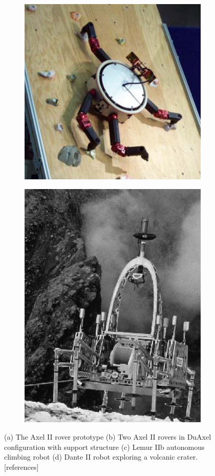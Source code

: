 \documentclass[12pt]{article}
\newcommand{\kostas}[1]{{\color{blue} #1}}
\begin{document}
\begin{figure}
\begin{subfigure}{.245\textwidth}
    \includegraphics[width=.88\linewidth]{lemur_prototype}
    \caption{}
    \label{fig:lemur}
  \end{subfigure}%
  \begin{subfigure}{.245\textwidth}
    \centering
    \includegraphics[width=.65\linewidth]{dante_prototype}
    \caption{}
    \label{fig:dante}
  \end{subfigure}  %
  \label{fig:prototypes}
  \vspace{-0.1in}
  \caption{(a) The Axel II rover prototype (b) Two Axel II rovers in DuAxel configuration 
  with support structure (c) Lemur IIb autonomous climbing robot (d) Dante II robot exploring a 
  volcanic crater. \kostas{[references]}}
\end{figure}
\end{document}
